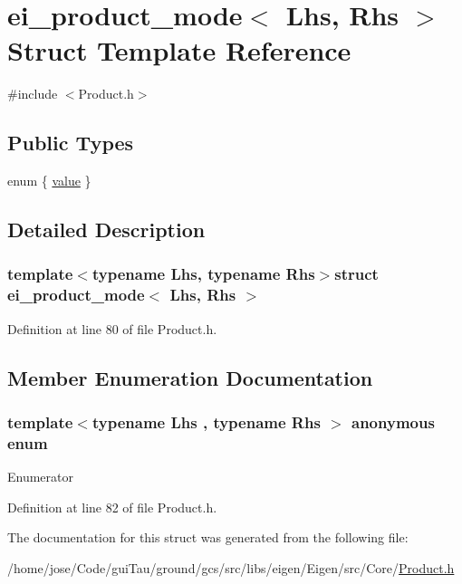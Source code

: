 \hypertarget{structei__product__mode}{\section{ei\-\_\-product\-\_\-mode$<$ Lhs, Rhs $>$ Struct Template Reference}
\label{structei__product__mode}
}


{\ttfamily \#include $<$Product.\-h$>$}

\subsection*{Public Types}
\begin{DoxyCompactItemize}
\item 
enum \{ \hyperlink{structei__product__mode_ad7a77e1a2c8964f2e070dd25c2319ef1a33ad2a85b21b05fbb227e832c4eabdeb}{value}
 \}
\end{DoxyCompactItemize}


\subsection{Detailed Description}
\subsubsection*{template$<$typename Lhs, typename Rhs$>$struct ei\-\_\-product\-\_\-mode$<$ Lhs, Rhs $>$}



Definition at line 80 of file Product.\-h.



\subsection{Member Enumeration Documentation}
\hypertarget{structei__product__mode_ad7a77e1a2c8964f2e070dd25c2319ef1}{\subsubsection[{anonymous enum}]{\setlength{\rightskip}{0pt plus 5cm}template$<$typename Lhs , typename Rhs $>$ anonymous enum}}\label{structei__product__mode_ad7a77e1a2c8964f2e070dd25c2319ef1}
\begin{Desc}
\item[Enumerator]\par
\begin{description}
\item[{\em 
\hypertarget{structei__product__mode_ad7a77e1a2c8964f2e070dd25c2319ef1a33ad2a85b21b05fbb227e832c4eabdeb}{value}\label{structei__product__mode_ad7a77e1a2c8964f2e070dd25c2319ef1a33ad2a85b21b05fbb227e832c4eabdeb}
}]\end{description}
\end{Desc}


Definition at line 82 of file Product.\-h.



The documentation for this struct was generated from the following file\-:\begin{DoxyCompactItemize}
\item 
/home/jose/\-Code/gui\-Tau/ground/gcs/src/libs/eigen/\-Eigen/src/\-Core/\hyperlink{_product_8h}{Product.\-h}\end{DoxyCompactItemize}
